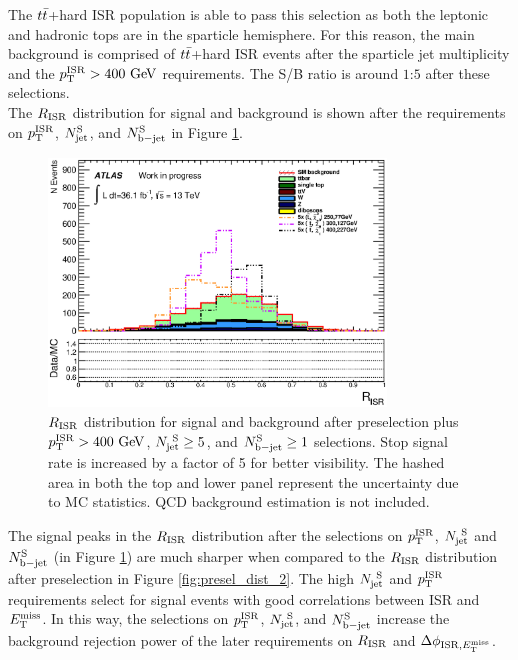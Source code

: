 \indent The $t\bar{t}$+hard ISR population is able to pass this selection as both the leptonic and hadronic tops are in the sparticle hemisphere.  For this reason, the main background is comprised of $t\bar{t}$+hard ISR events after the sparticle jet multiplicity and the $\pTISR > 400 \GeV$ requirements.  The S/B ratio is around $1$:$5$ after these selections.  \\

\indent The $\RISR$ distribution for signal and background is shown after the requirements on $p_{\mathrm{T}}^{\mathrm{ISR}}$, $N_{\mathrm{jet}}^{\mathrm{S}}$, and $N_{\mathrm{b-jet}}^{\mathrm{S}}$ in Figure \ref{fig:SR:jetMulti}. \\

\begin{figure}[h!]
  \begin{center}
    \includegraphics[width=0.80\textwidth]{figures/plotSR/SR_ND1_RISR_3SR.eps}
    \caption[$\RISR$ distribution for signal and background after preselection plus $\PTISR > 400 \gev$, $\NjV \ge 5$, and $\nBJetS \ge 1$ selections]{ $\RISR$ distribution for signal and background after preselection plus $\PTISR > 400 \gev$, $\NjV \ge 5$, and $\nBJetS \ge 1$ selections.  Stop signal rate is increased by a factor of 5 for better visibility. The hashed area in both the top and lower panel represent the uncertainty due to MC statistics.  QCD background estimation is not included.  }
  \label{fig:SR:jetMulti}
    \end{center}
\end{figure}

\indent The signal peaks in the $\RISR$ distribution after the selections on $p_{\mathrm{T}}^{\mathrm{ISR}}$, $N_{\mathrm{jet}}^{~\mathrm{S}}$ and $N_{\mathrm{b-jet}}^{\mathrm{S}}$ (in Figure \ref{fig:SR:jetMulti}) are much sharper when compared to the $\RISR$ distribution after preselection in Figure \ref{fig:presel_dist_2}.  The high $N_{\mathrm{jet}}^{~\mathrm{S}}$ and $p_{\mathrm{T}}^{\mathrm{ISR}}$ requirements select for signal events with good correlations between ISR and $E_{\mathrm{T}}^{\mathrm{miss}}$.  In this way, the selections on $p_{\mathrm{T}}^{\mathrm{ISR}}$, $N_{\mathrm{jet}}^{~\mathrm{S}}$, and $N_{\mathrm{b-jet}}^{\mathrm{S}}$ increase the background rejection power of the later requirements on $\RISR$ and $\Delta\phi_{\mathrm{ISR},E_{\mathrm{T}}^{\mathrm{miss}}}$.  \\

